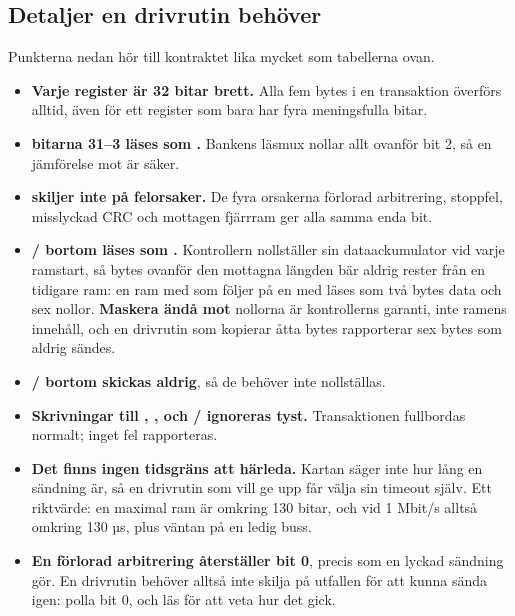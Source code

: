 \subsection{Detaljer en drivrutin behöver}
\label{app:protocol:driver}

Punkterna nedan hör till kontraktet lika mycket som tabellerna ovan.

\begin{itemize}
  \item \textbf{Varje register är 32 bitar brett.} Alla fem bytes i en transaktion överförs alltid,
    även för ett register som bara har fyra meningsfulla bitar.
  \item \textbf{ bitarna 31--3 läses som .} Bankens läsmux nollar allt ovanför
    bit 2, så en jämförelse mot  är säker.
  \item \textbf{ skiljer inte på felorsaker.} De fyra orsakerna \textemdash{}
    förlorad arbitrering, stoppfel, misslyckad CRC och mottagen fjärrram \textemdash{} ger alla samma
    enda bit.
  \item \textbf{/ bortom  läses som .} Kontrollern
    nollställer sin dataackumulator vid varje ramstart, så bytes ovanför den mottagna längden bär
    aldrig rester från en tidigare ram: en ram med  som följer på en med
     läses som två bytes data och sex nollor. \textbf{Maskera ändå mot }
    \textemdash{} nollorna är kontrollerns garanti, inte ramens innehåll, och en drivrutin som
    kopierar åtta bytes rapporterar sex bytes som aldrig sändes.
  \item \textbf{/ bortom  skickas aldrig}, så de behöver inte
    nollställas.
  \item \textbf{Skrivningar till , ,  och
    / ignoreras tyst.} Transaktionen fullbordas normalt; inget fel
    rapporteras.
  \item \textbf{Det finns ingen tidsgräns att härleda.} Kartan säger inte hur lång en sändning är, så
    en drivrutin som vill ge upp får välja sin timeout själv. Ett riktvärde: en maximal ram är
    omkring 130 bitar, och vid 1 Mbit/s alltså omkring 130 µs, plus väntan på en ledig buss.
  \item \textbf{En förlorad arbitrering återställer  bit 0}, precis som en lyckad
    sändning gör. En drivrutin behöver alltså inte skilja på utfallen för att kunna sända igen:
    polla bit 0, och läs  för att veta hur det gick.
\end{itemize}

